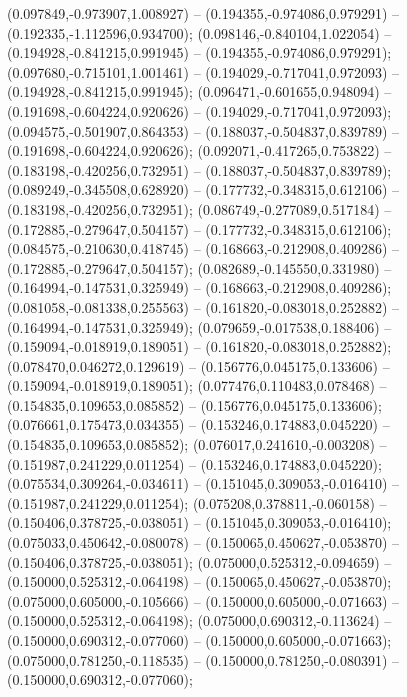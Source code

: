 (0.097849,-0.973907,1.008927) -- (0.194355,-0.974086,0.979291) -- (0.192335,-1.112596,0.934700);
 (0.098146,-0.840104,1.022054) -- (0.194928,-0.841215,0.991945) -- (0.194355,-0.974086,0.979291);
 (0.097680,-0.715101,1.001461) -- (0.194029,-0.717041,0.972093) -- (0.194928,-0.841215,0.991945);
 (0.096471,-0.601655,0.948094) -- (0.191698,-0.604224,0.920626) -- (0.194029,-0.717041,0.972093);
 (0.094575,-0.501907,0.864353) -- (0.188037,-0.504837,0.839789) -- (0.191698,-0.604224,0.920626);
 (0.092071,-0.417265,0.753822) -- (0.183198,-0.420256,0.732951) -- (0.188037,-0.504837,0.839789);
 (0.089249,-0.345508,0.628920) -- (0.177732,-0.348315,0.612106) -- (0.183198,-0.420256,0.732951);
 (0.086749,-0.277089,0.517184) -- (0.172885,-0.279647,0.504157) -- (0.177732,-0.348315,0.612106);
 (0.084575,-0.210630,0.418745) -- (0.168663,-0.212908,0.409286) -- (0.172885,-0.279647,0.504157);
 (0.082689,-0.145550,0.331980) -- (0.164994,-0.147531,0.325949) -- (0.168663,-0.212908,0.409286);
 (0.081058,-0.081338,0.255563) -- (0.161820,-0.083018,0.252882) -- (0.164994,-0.147531,0.325949);
 (0.079659,-0.017538,0.188406) -- (0.159094,-0.018919,0.189051) -- (0.161820,-0.083018,0.252882);
 (0.078470,0.046272,0.129619) -- (0.156776,0.045175,0.133606) -- (0.159094,-0.018919,0.189051);
 (0.077476,0.110483,0.078468) -- (0.154835,0.109653,0.085852) -- (0.156776,0.045175,0.133606);
 (0.076661,0.175473,0.034355) -- (0.153246,0.174883,0.045220) -- (0.154835,0.109653,0.085852);
 (0.076017,0.241610,-0.003208) -- (0.151987,0.241229,0.011254) -- (0.153246,0.174883,0.045220);
 (0.075534,0.309264,-0.034611) -- (0.151045,0.309053,-0.016410) -- (0.151987,0.241229,0.011254);
 (0.075208,0.378811,-0.060158) -- (0.150406,0.378725,-0.038051) -- (0.151045,0.309053,-0.016410);
 (0.075033,0.450642,-0.080078) -- (0.150065,0.450627,-0.053870) -- (0.150406,0.378725,-0.038051);
 (0.075000,0.525312,-0.094659) -- (0.150000,0.525312,-0.064198) -- (0.150065,0.450627,-0.053870);
 (0.075000,0.605000,-0.105666) -- (0.150000,0.605000,-0.071663) -- (0.150000,0.525312,-0.064198);
 (0.075000,0.690312,-0.113624) -- (0.150000,0.690312,-0.077060) -- (0.150000,0.605000,-0.071663);
 (0.075000,0.781250,-0.118535) -- (0.150000,0.781250,-0.080391) -- (0.150000,0.690312,-0.077060);
